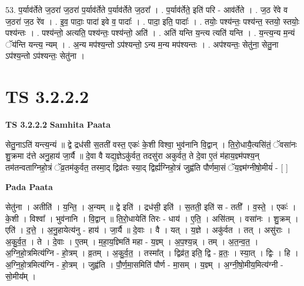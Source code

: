 \documentclass[17pt]{extarticle}
\begin{document}
53. प॒र्याव॑र्तेते ज॒ठरा॑ ज॒ठरा॑ प॒र्याव॑र्तेते प॒र्याव॑र्तेते ज॒ठरा᳚ । . प॒र्याव॑र्तेते॒ इति॑ परि - आव॑र्तेते । . ज॒ठ रे॑वे व ज॒ठरा॑ ज॒ठ रे॑व । . इ॒व॒ पादाः॒ पादा॑ इवे व॒ पादाः᳚ । . पादा॒ इति॒ पादाः᳚ । . तयोः॒ पश्य॑न्तः॒ पश्य॑न्त॒ स्तयो॒ स्तयोः॒ पश्य॑न्तः । . पश्य॑न्तो॒ अत्यति॒ पश्य॑न्तः॒ पश्य॑न्तो॒ अति॑ । . अति॑ यन्ति य॒न्त्य त्यति॑ यन्ति । . य॒न्त्य॒न्य म॒न्यं ॅय॑न्ति यन्त्य॒ न्यम् । . अ॒न्य मप॑श्य॒न्तो ऽप॑श्यन्तो॒ ऽन्य म॒न्य मप॑श्यन्तः । . अप॑श्यन्तः॒ सेतु॑ना॒ सेतु॒ना ऽप॑श्य॒न्तो ऽप॑श्यन्तः॒ सेतु॑ना । \newline


\section{ TS 3.2.2.2 }

\textbf{TS 3.2.2.2 } \newline
\textbf{Samhita Paata} \newline

सेतु॒नाऽति॑ यन्त्य॒न्यं ॥ द्वे द्रध॑सी स॒तती॑ वस्त॒ एकः॑ के॒शी विश्वा॒ भुव॑नानि वि॒द्वान् । ति॒रो॒धायै॒त्यसि॑तं॒ ॅवसा॑नः शु॒क्रमा द॑त्ते अनु॒हाय॑ जा॒र्यै ॥ दे॒वा वै यद्य॒ज्ञेऽकु॑र्वत॒ तदसु॑रा अकुर्वत॒ ते दे॒वा ए॒तं म॑हाय॒ज्ञ्म॑पश्य॒न् तम॑तन्वताग्निहो॒त्रं ॅव्र॒तम॑कुर्वत॒ तस्मा॒द् द्विव्र॑तः स्या॒द् द्विर्ह्य॑ग्निहो॒त्रं जुह्व॑ति पौर्णमा॒सं ॅय॒ज्ञ्म॑ग्नीषो॒मीयं॑ - [  ] \newline

\textbf{Pada Paata} \newline

सेतु॑ना । अतीति॑ । य॒न्ति॒ । अ॒न्यम् ॥ द्वे इति॑ । द्रध॑सी॒ इति॑ । स॒तती॒ इति॑ स - तती᳚ । व॒स्ते॒ । एकः॑ । के॒शी । विश्वा᳚ । भुव॑नानि । वि॒द्वान् ॥ ति॒रो॒धायेति॑ तिरः - धाय॑ । ए॒ति॒ । असि॑तम् । वसा॑नः । शु॒क्रम् । एति॑ । द॒त्ते॒ । अ॒नु॒हायेत्य॑नु - हाय॑ । जा॒र्यै ॥ दे॒वाः । वै । यत् । य॒ज्ञे । अकु॑र्वत । तत् । असु॑राः । अ॒कु॒र्व॒त॒ । ते । दे॒वाः । ए॒तम् । म॒हा॒य॒ज्ञ्मिति॑ महा - य॒ज्ञ्म् । अ॒प॒श्य॒न्न् । तम् । अ॒त॒न्व॒त॒ । अ॒ग्नि॒हो॒त्रमित्य॑ग्नि - हो॒त्रम् । व्र॒तम् । अ॒कु॒र्व॒त॒ । तस्मा᳚त् । द्विव्र॑त॒ इति॒ द्वि - व्र॒तः॒ । स्या॒त् । द्विः । हि । अ॒ग्नि॒हो॒त्रमित्य॑ग्नि - हो॒त्रम् । जुह्व॑ति । पौ॒र्ण॒मा॒समिति॑ पौर्ण - मा॒सम् । य॒ज्ञ्म् । अ॒ग्नी॒षो॒मीय॒मित्य॑ग्नी - सो॒मीय᳚म् ।  \newline
\end{document}
